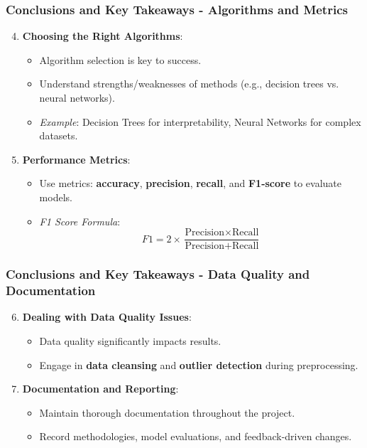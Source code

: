 \documentclass[aspectratio=169]{beamer}
\begin{document}
\begin{frame}[fragile]
    \frametitle{Conclusions and Key Takeaways - Algorithms and Metrics}
    \begin{enumerate}
        \setcounter{enumi}{3}
        \item \textbf{Choosing the Right Algorithms}:
        \begin{itemize}
            \item Algorithm selection is key to success.
            \item Understand strengths/weaknesses of methods (e.g., decision trees vs. neural networks).
            \item \textit{Example}: Decision Trees for interpretability, Neural Networks for complex datasets.
        \end{itemize}

        \item \textbf{Performance Metrics}:
        \begin{itemize}
            \item Use metrics: \textbf{accuracy}, \textbf{precision}, \textbf{recall}, and \textbf{F1-score} to evaluate models.
            \item \textit{F1 Score Formula}:
            \begin{equation}
                F1 = 2 \times \frac{{\text{Precision} \times \text{Recall}}}{{\text{Precision} + \text{Recall}}}
            \end{equation}
        \end{itemize}
    \end{enumerate}
\end{frame}

\begin{frame}[fragile]
    \frametitle{Conclusions and Key Takeaways - Data Quality and Documentation}
    \begin{enumerate}
        \setcounter{enumi}{5}
        \item \textbf{Dealing with Data Quality Issues}:
        \begin{itemize}
            \item Data quality significantly impacts results.
            \item Engage in \textbf{data cleansing} and \textbf{outlier detection} during preprocessing.
        \end{itemize}

        \item \textbf{Documentation and Reporting}:
        \begin{itemize}
            \item Maintain thorough documentation throughout the project.
            \item Record methodologies, model evaluations, and feedback-driven changes.
        \end{itemize}
    \end{enumerate}
\end{frame}
\end{document}
